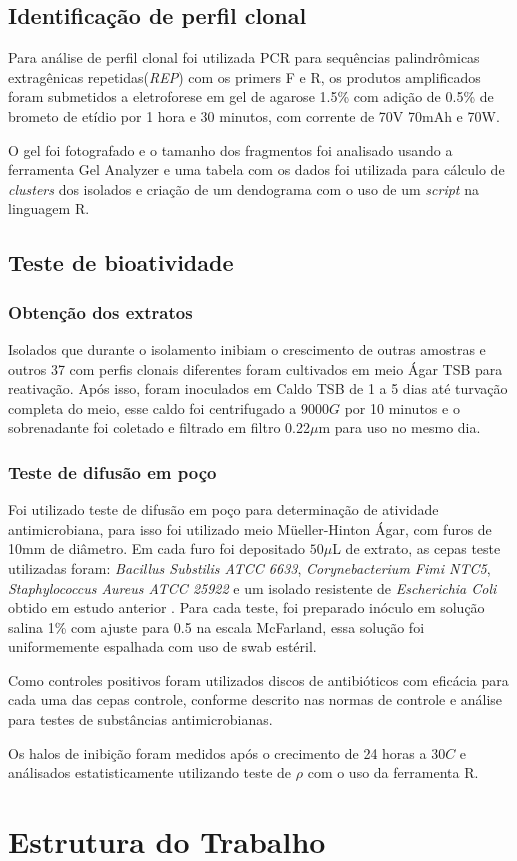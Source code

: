 \subsection{Identificação de perfil clonal}
Para análise de perfil clonal foi utilizada PCR para sequências palindrômicas
extragênicas repetidas(\textit{REP}) com os primers F e R, os produtos amplificados
foram submetidos a eletroforese em gel de agarose 1.5\% com adição de 0.5\% de
brometo de etídio por 1 hora e 30 minutos, com corrente de 70V 70mAh e 70W.

O gel foi fotografado e o tamanho dos fragmentos foi analisado usando a ferramenta
Gel Analyzer e uma tabela com os dados foi utilizada para cálculo de \textit{clusters}
dos isolados e criação de um dendograma com o uso de um \textit{script} na
linguagem R.

\subsection{Teste de bioatividade}
\subsubsection{Obtenção dos extratos}
Isolados que durante o isolamento inibiam o crescimento de outras amostras e outros 37
com perfis clonais diferentes foram cultivados em meio Ágar TSB para
reativação. Após isso, foram inoculados em Caldo TSB de 1 a 5 dias até turvação completa
do meio, esse caldo foi centrifugado a 9000$G$ por 10 minutos e o sobrenadante foi coletado
e filtrado em filtro 0.22$\mu$m para uso no mesmo dia.
\subsubsection{Teste de difusão em poço}
Foi utilizado teste de difusão em poço para determinação de atividade antimicrobiana,
para isso foi utilizado meio Müeller-Hinton Ágar, com furos de 10mm de diâmetro.
Em cada furo foi depositado $50\mu$L de extrato, as cepas teste utilizadas foram:
\textit{Bacillus Substilis ATCC 6633}, \textit{Corynebacterium Fimi NTC5}, \textit{Staphylococcus Aureus ATCC 25922}
e um isolado resistente de \textit{Escherichia Coli} obtido em estudo anterior \cite{dhara2019}.
Para cada teste, foi preparado inóculo em solução salina 1\% com ajuste para 0.5
na escala McFarland, essa solução foi uniformemente espalhada com uso de swab estéril.

Como controles positivos foram utilizados discos de antibióticos com
eficácia para cada uma das cepas controle, conforme descrito nas normas de controle e
análise para testes de substâncias antimicrobianas\cite{clsi2020}.

Os halos de inibição foram medidos após o crecimento de 24 horas a $30$\textdegree$C$
e análisados estatisticamente utilizando teste de $\rho$ com
o uso da ferramenta R.


\section{Estrutura do Trabalho}



